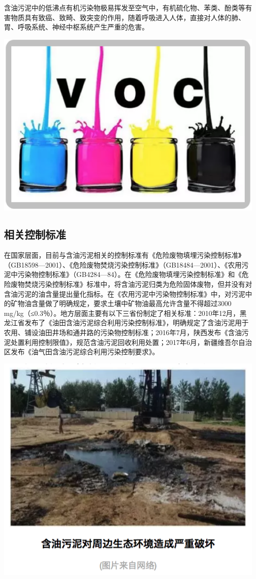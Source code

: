 \documentclass[]{book}
\begin{document}
含油污泥中的低沸点有机污染物极易挥发至空气中，有机硫化物、苯类、酚类等有害物质具有致癌、致畸、致突变的作用，随着呼吸进入人体，直接对人体的肺、胃、呼吸系统、神经中枢系统产生严重的危害。

\includegraphics[width=8.33in]{images/youni7}

\subsection{相关控制标准}

在国家层面，目前与含油污泥相关的控制标准有《危险废物填埋污染控制标准》（GB18598---2001）、《危险废物焚烧污染控制标准》（GB18484---2001）、《农用污泥中污染物控制标准》（GB4284---84）。在《危险废物填埋污染控制标准》和《危险废物焚烧污染控制标准》标准中，将含油污泥归类为危险固体废物，但并没有对含油污泥的油含量提出量化指标。在《农用污泥中污染物控制标准》中，对污泥中的矿物油含量做了明确规定，要求土壤中矿物油最高允许含量不得超过3000
mg/kg（≤0.3％）。地方层面主要有以下三省份制定了相关标准：2010年12月，黑龙江省发布了《油田含油污泥综合利用污染控制标准》，明确规定了含油污泥用于农用、铺设油田井场和通井路的污染物控制标准；2016年7月，陕西发布《含油污泥处置利用控制限值》，规范含油污泥回收利用处置；2017年6月，新疆维吾尔自治区发布《油气田含油污泥综合利用污染控制要求》。

\includegraphics[width=8.33in]{images/youni8}
\end{document}
